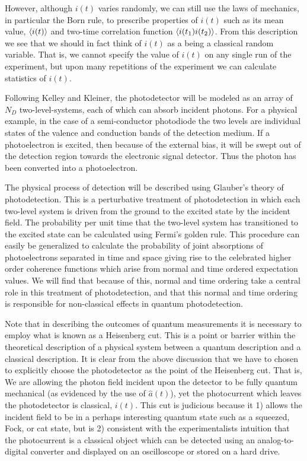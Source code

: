 \documentclass[12pt]{article}
\begin{document}
However, although $i(t)$ varies randomly, we can still use the laws of mechanics, in particular the Born rule, to prescribe properties of $i(t)$ such as its mean value, $\Braket{i(t)}$ and two-time correlation function $\Braket{i(t_1)i(t_2)}$. From this description we see that we should in fact think of $i(t)$ as a being a classical random variable. That is, we cannot specify the value of $i(t)$ on any single run of the experiment, but upon many repetitions of the experiment we can calculate statistics of $i(t)$.

Following Kelley and Kleiner\cite{Kelley1964}, the photodetector will be modeled as an array of $N_D$ two-level-systems, each of which can absorb incident photons. For a physical example, in the case of a semi-conductor photodiode the two levels are individual states of the valence and conduction bands of the detection medium. If a photoelectron is excited, then because of the external bias, it will be swept out of the detection region towards the electronic signal detector. Thus the photon has been converted into a photoelectron.

The physical process of detection will be described using Glauber's theory of photodetection\cite{Glauber1963}. This is a perturbative treatment of photodetection in which each two-level system is driven from the ground to the excited state by the incident field. The probability per unit time that the two-level system has transitioned to the excited state can be calculated using Fermi's golden rule. This procedure can easily be generalized to calculate the probability of joint absorptions of photoelectrons separated in time and space giving rise to the celebrated higher order coherence functions which arise from normal and time ordered expectation values. We will find that because of this, normal and time ordering take a central role in this treatment of photodetection, and that this normal and time ordering is responsible for non-classical effects in quantum photodetection.

Note that in describing the outcomes of quantum measurements it is necessary to employ what is known as a Heisenberg cut. This is a point or barrier within the theoretical description of a physical system between a quantum description and a classical description. It is clear from the above discussion that we have to chosen to explicitly choose the photodetector as the point of the Heisenberg cut. That is, We are allowing the photon field incident upon the detector to be fully quantum mechanical (as evidenced by the use of $\hat{a}(t)$), yet the photocurrent which leaves the photodetector is classical, $i(t)$. This cut is judicious because it 1) allows the incident field to be in a perhaps interesting quantum state such as a squeezed, Fock, or cat state, but is 2) consistent with the experimentalists intuition that the photocurrent is a classical object which can be detected using an analog-to-digital converter and displayed on an oscilloscope or stored on a hard drive.
\end{document}
